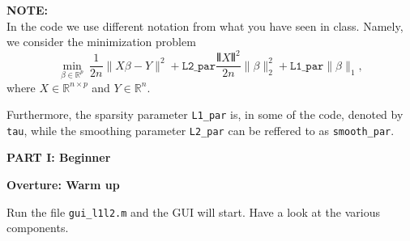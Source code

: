 \documentclass[DIN, pagenumber=false, fontsize=11pt, parskip=half]{scrartcl}
\newcommand{\mysection}[1]{\noindent\large\textbf{#1}}
\begin{document}
\begin{framed}
\textbf{NOTE:} \\
In the code we use different notation from what you have seen in class. Namely, we consider the minimization problem
\begin{equation*}
\min_{\beta\in \mathbb{R}^p} \  \frac{1}{2n} \|X\beta-Y\|^2 +
\texttt{L2\_par} \frac{\VERT X \VERT^2}{2n}\|\beta\|^2_2 +
\texttt{L1\_par}\|\beta\|_1 ,
\end{equation*}
where $X \in \mathbb{R}^{n \times p}$ and $Y \in \mathbb{R}^n$.

Furthermore, the sparsity parameter \texttt{L1\_par} is, in some of the code, denoted by \texttt{tau}, while the smoothing parameter \texttt{L2\_par} can be reffered to as \texttt{smooth\_par}.
\end{framed}














\newpage
\begin{center}
\large\textbf{PART I: Beginner}
\end{center}

\mysection{Overture: Warm up}

Run the file \texttt{gui\_l1l2.m} and the GUI will start. Have a look at the various components.
\end{document}
